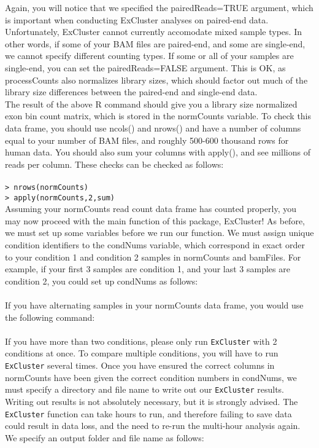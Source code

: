 \documentclass[12pt]{article}
\newcommand{\R}[1]{{\texttt{#1}}}
\begin{document}
Again, you will notice that we specified the pairedReads=TRUE argument, which is important when conducting ExCluster analyses on paired-end data. Unfortunately, ExCluster cannot currently accomodate mixed sample types. In other words, if some of your BAM files are paired-end, and some are single-end, we cannot specify different counting types. If some or all of your samples are single-end, you can set the pairedReads=FALSE argument. This is OK, as processCounts also normalizes library sizes, which should factor out much of the library size differences between the paired-end and single-end data.\\

The result of the above R command should give you a library size normalized exon bin count matrix, which is stored in the normCounts variable. To check this data frame, you should use ncols() and nrows() and have a number of columns equal to your number of BAM files, and roughly 500-600 thousand rows for human data. You should also sum your columns with apply(), and see millions of reads per column. These checks can be checked as follows:\\

\noindent\R{> ncols(normCounts)}\\
\R{> nrows(normCounts)}\\
\R{> apply(normCounts,2,sum)}\\

Assuming your normCounts read count data frame has counted properly, you may now proceed with the main function of this package, ExCluster! As before, we must set up some variables before we run our function. We must assign unique condition identifiers to the condNums variable, which correspond in exact order to your condition 1 and condition 2 samples in normCounts and bamFiles. For example, if your first 3 samples are condition 1, and your last 3 samples are condition 2, you could set up condNums as follows:\\

\noindent\R{> condNums <- c(1,1,1,2,2,2)}\\

If you have alternating samples in your normCounts data frame, you would use the following command:\\

\noindent\R{> condNums <- c(1,2,1,2,1,2)}\\

If you have more than two conditions, please only run \R{ExCluster} with 2 conditions at once. To compare multiple conditions, you will have to run \R{ExCluster} several times. Once you have ensured the correct columns in normCounts have been given the correct condition numbers in condNums, we must specify a directory and file name to write out our \R{ExCluster} results. Writing out results is not absolutely necessary, but it is strongly advised. The \R{ExCluster} function can take hours to run, and therefore failing to save data could result in data loss, and the need to re-run the multi-hour analysis again. We specify an output folder and file name as follows:\\
\end{document}
